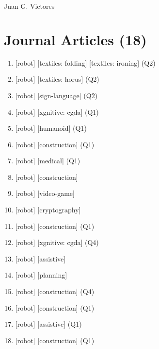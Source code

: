 \documentclass{article}
\def\name{Juan G. Victores}
\begin{document}
{\huge \name}

\vspace{0.2in}



\section*{Journal Articles (18)}
\begin{enumerate}
  \item {} [robot] [textiles: folding] [textiles: ironing] (Q2)
  \item {} [robot] [textiles: horus] (Q2)
  \item {} [robot] [sign-language] (Q2)
  \item {} [robot] [xgnitive: cgda] (Q1)
  \item {} [robot] [humanoid] (Q1)
  \item {} [robot] [construction] (Q1)
  \item {} [robot] [medical] (Q1)
  \item {} [robot] [construction]
  \item {} [robot] [video-game]
  \item {} [robot] [cryptography]
  \item {} [robot] [construction] (Q1)
  \item {} [robot] [xgnitive: cgda] (Q4)
  \item {} [robot] [assistive]
  \item {} [robot] [planning]
  \item {} [robot] [construction] (Q4)
  \item {} [robot] [construction] (Q1)
  \item {} [robot] [assistive] (Q1)
  \item {} [robot] [construction] (Q1)
\end{enumerate}
\end{document}
